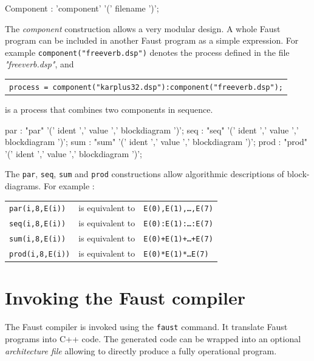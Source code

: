 \documentclass{article}
\begin{document}
\begin{rail}
Component : 'component' '(' filename ')';
\end{rail}
The \emph{component} construction allows a very modular design. A whole Faust program can be included in another Faust program as a simple expression. For example \texttt{component("freeverb.dsp")} denotes the process defined in the file \emph{"freeverb.dsp"}, and 

\begin{tabular}{l}
\texttt{process = component("karplus32.dsp"):component("freeverb.dsp");} \\
\end{tabular}

is a process that combines two components in sequence.

\begin{rail}
par : "par" '(' ident ',' value ',' blockdiagram ')';
seq : "seq" '(' ident ',' value ',' blockdiagram ')';
sum : "sum" '(' ident ',' value ',' blockdiagram ')';
prod : "prod" '(' ident ',' value ',' blockdiagram ')';
\end{rail}
The \texttt{par}, \texttt{seq}, \texttt{sum} and \texttt{prod} constructions allow algorithmic descriptions of block-diagrams.
For example :

\begin{tabular}{lll}
\texttt{par(i,8,E(i))} &is equivalent to &\texttt{E(0),E(1),\ldots ,E(7)} \\
\texttt{seq(i,8,E(i))} &is equivalent to &\texttt{E(0):E(1):\ldots :E(7)} \\
\texttt{sum(i,8,E(i))} &is equivalent to &\texttt{E(0)+E(1)+\ldots +E(7)} \\
\texttt{prod(i,8,E(i))} &is equivalent to &\texttt{E(0)*E(1)*\ldots *E(7)}\\
\end{tabular}




\section{Invoking the Faust compiler}
The Faust compiler is invoked using the \texttt{faust} command. It translate Faust programs into C++ code.
The generated code can be wrapped into an optional \emph{architecture file} allowing to directly produce a fully operational program.
\end{document}
